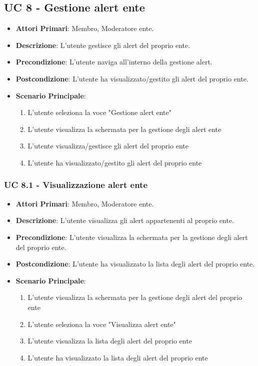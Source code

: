 	\subsection{UC 8 - Gestione alert ente}
			
		\begin{itemize}
			\item \textbf{Attori Primari}: Membro, Moderatore ente.
			\item \textbf{Descrizione}: L'utente gestisce gli alert del proprio ente.
			\item \textbf{Precondizione}: L'utente naviga all'interno della gestione alert.
			\item \textbf{Postcondizione}: L'utente ha visualizzato/gestito gli alert del proprio ente.
			\item \textbf{Scenario Principale}:
			\begin{enumerate}
				\item{L'utente seleziona la voce "Gestione alert ente"}
				\item{L'utente visualizza la schermata per la gestione degli alert ente}
				\item{L'utente visualizza/gestisce gli alert del proprio ente}
				\item{L'utente ha visualizzato/gestito gli alert del proprio ente}
			\end{enumerate}	
		\end{itemize}
			
			\subsubsection{UC 8.1 - Visualizzazione alert ente}
			\begin{itemize}
				\item \textbf{Attori Primari}: Membro, Moderatore ente.
				\item \textbf{Descrizione}: L'utente visualizza gli alert appartenenti al proprio ente.
				\item \textbf{Precondizione}: L'utente visualizza la schermata per la gestione degli alert del proprio ente.
				\item \textbf{Postcondizione}: L'utente ha visualizzato la lista degli alert del proprio ente.
				\item \textbf{Scenario Principale}:
				\begin{enumerate}
					\item{L'utente visualizza la schermata per la gestione degli alert del proprio ente}
					\item{L'utente seleziona la voce "Visualizza alert ente"}
					\item{L'utente visualizza la lista degli alert del proprio ente}
					\item{L'utente ha visualizzato la lista degli alert del proprio ente}
				\end{enumerate}	
			\end{itemize}
			
